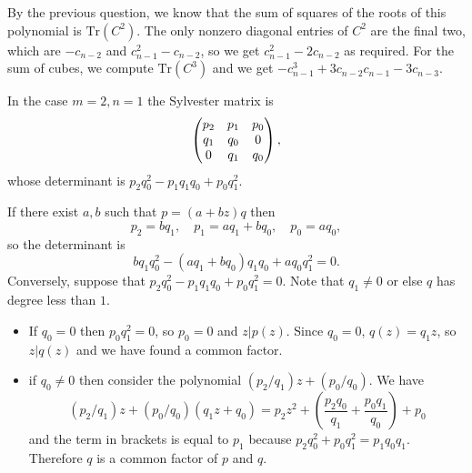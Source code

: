 \documentclass{article}
\begin{document}
\begin{Solution}
By the previous question, we know that the sum of squares of the
roots of this polynomial is \(\mathrm{Tr}(C^2)\). The only nonzero
diagonal entries of \(C^2\) are the final two, which are
\(-c_{n-2}\) and \(c_{n-1}^2-c_{n-2}\), so we get
\(c_{n-1}^2-2c_{n-2}\) as required. For the sum of cubes, we compute
\(\mathrm{Tr}(C^3)\) and we get
\(-c_{n-1}^3+3c_{n-2}c_{n-1}-3c_{n-3}\).


\end{Solution}
\begin{Solution}
In the case \(m=2,n=1\) the Sylvester matrix is
\[\begin{pmatrix} p_2 & p_1 & p_0 \\ q_1 & q_0 & 0 \\ 0 & q_1 & q_0\end{pmatrix},\]
whose determinant is \(p_2q_0^2-p_1q_1q_0+p_0q_1^2\).


If there exist \(a,b\) such that \(p=(a+bz)q\) then \[p_2=bq_1,\quad
p_1=aq_1+bq_0,\quad p_0=aq_0,\] so the determinant is
\[bq_1q_0^2-(aq_1+bq_0)q_1q_0+aq_0q_1^2=0.\] Conversely, suppose
that \(p_2q_0^2-p_1q_1q_0+p_0q_1^2=0\). Note that \(q_1\neq 0\) or
else \(q\) has degree less than \(1\).
\begin{itemize}
\item If \(q_0=0\) then \(p_0q_1^2=0\), so \(p_0=0\) and
\(z|p(z)\). Since \(q_0=0\), \(q(z)=q_1z\), so \(z|q(z)\) and we
have found a common factor.
\item if \(q_0\neq 0\) then consider the polynomial
\((p_2/q_1)z+(p_0/q_0)\). We have
\[(p_2/q_1)z+(p_0/q_0)(q_1z+q_0)=p_2z^2+\left(\frac{p_2q_0}{q_1}+\frac{p_0q_1}{q_0}\right)+p_0\]
and the term in brackets is equal to \(p_1\) because
\(p_2q_0^2+p_0q_1^2=p_1q_0q_1\). Therefore \(q\) is a common
factor of \(p\) and \(q\).
\end{itemize}
\end{Solution}
\end{document}
